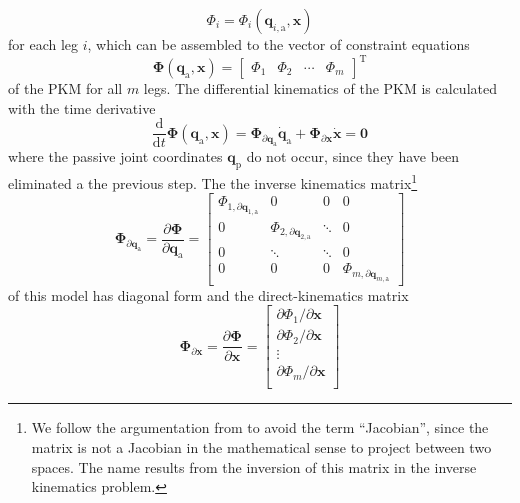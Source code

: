 \documentclass[robotics,article,submit,moreauthors,pdftex]{Definitions/mdpi}
\newcommand{\bm}[1]{\boldsymbol{#1}}
\newcommand{\transp}[0]{{\mathrm{T}}}
\begin{document}
\begin{equation}
\Phi_{i}
=
\Phi_{i}(\bm{q}_{i,\mathrm{a}},\bm{x})
\end{equation}
%
for each leg $i$, which can be assembled to the vector of constraint equations
%
\begin{equation}
\bm{\Phi}(\bm{q}_{\mathrm{a}},\bm{x})
=
\begin{bmatrix}
\Phi_1 & \Phi_2 & \cdots & \Phi_m
\end{bmatrix}^\transp
\end{equation}
%
of the PKM for all $m$ legs.
The differential kinematics of the PKM is calculated with the time derivative
%
\begin{equation}
\frac{\mathrm{d}}{{\mathrm{d}}t} \bm{\Phi}(\bm{q}_\mathrm{a},\bm{x})
=
\bm{\Phi}_{\partial \bm{q}_\mathrm{a}}  \dot{\bm{q}}_\mathrm{a}
+
\bm{\Phi}_{\partial \bm{x}} \dot{\bm{x}}
=
\bm{0}
\end{equation}
%
where the passive joint coordinates $\bm{q}_{\mathrm{p}}$ do not occur, since they have been eliminated a the previous step.
The the inverse kinematics matrix\footnote{We follow the argumentation from \cite{Gogu2008} to avoid the term ``Jacobian'', since the matrix is not a Jacobian in the mathematical sense to project between two spaces. The name results from the inversion of this matrix in the inverse kinematics problem.}
%
\begin{equation}
\bm{\Phi}_{\partial \bm{q}_{\mathrm{a}}}
=
\frac{\partial \bm{\Phi}}{\partial \bm{q}_{\mathrm{a}}}
=
\begin{bmatrix}
\Phi_{1,\partial \bm{q}_{1,\mathrm{a}}}  & 0 & 0 & 0\\
0 & \Phi_{2,\partial \bm{q}_{2,\mathrm{a}}} & \ddots & 0  \\
0 & \ddots & \ddots & 0  \\
0 & 0 & 0 & \Phi_{m,\partial \bm{q}_{m,\mathrm{a}}}
\end{bmatrix}
\label{equ:PKM_phi_grad_q}
\end{equation}  
%
of this model has diagonal form and the direct-kinematics matrix
%
\begin{equation}
\bm{\Phi}_{\partial \bm{x}}
=
\frac{\partial \bm{\Phi}}{\partial \bm{x}}
=
\begin{bmatrix}
\partial \Phi_1/\partial \bm{x}\\
\partial \Phi_2/\partial \bm{x}\\
\vdots \\
\partial \Phi_m/\partial \bm{x}\\
\end{bmatrix}
\label{equ:PKM_phi_grad_x}
\end{equation}
\end{document}
